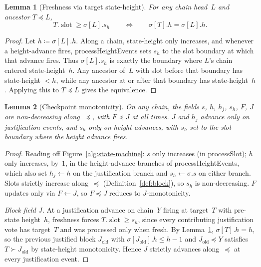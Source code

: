 \documentclass{article}
\newcommand{\slot}[0]{\ensuremath{\operatorname{\mathrm{slot}}}}
\newcommand{\processSlot}{\textsf{processSlot}\xspace}
\newcommand{\processHeightEvents}{\textsf{processHeightEvents}\xspace}
\theoremstyle{plain}
\newtheorem{lemma}{Lemma}
\theoremstyle{definition}
\theoremstyle{remark}
\begin{document}
\begin{lemma}[Freshness via target state-height]\label{lem:fresh-equiv}
For any chain head~$L$ and ancestor $T \preceq L$,
\[
  T.\slot \geq \sigma[L].s_h
  \qquad\Longleftrightarrow\qquad
  \sigma[T].h = \sigma[L].h .
\]
\end{lemma}

\begin{proof}
Let $h \coloneqq \sigma[L].h$.
Along a chain, state-height only increases, and whenever a height-advance fires, \processHeightEvents sets $s_h$ to the slot boundary at which that advance fires.
Thus $\sigma[L].s_h$ is exactly the boundary where $L$'s chain entered state-height~$h$.
Any ancestor of~$L$ with slot before that boundary has state-height $< h$, while any ancestor at or after that boundary has state-height~$h$.
Applying this to $T \preceq L$ gives the equivalence.
\end{proof}

\begin{lemma}[Checkpoint monotonicity]\label{lem:slotmono}
On any chain, the fields $s$, $h$, $h_j$, $s_h$, $F$, $J$ are non-decreasing along~$\preceq$, with $F \preceq J$ at all times.
$J$ and $h_j$ advance only on justification events, and $s_h$ only on height-advances, with $s_h$ set to the slot boundary where the height advance fires.
\end{lemma}

\begin{proof}
Reading off Figure~\ref{alg:state-machine}: $s$ only increases (in \processSlot); $h$ only increases, by~$1$, in the height-advance branches of \processHeightEvents, which also set $h_j \gets h$ on the justification branch and $s_h \gets \sigma.s$ on either branch.
Slots strictly increase along~$\preceq$ (Definition~\ref{def:block}), so $s_h$ is non-decreasing.
$F$ updates only via $F \gets J$, so $F \preceq J$ reduces to $J$-monotonicity.

\emph{Block field $J$.}
At a justification advance on chain~$Y$ firing at target~$T$ with pre-state height~$h$, freshness forces $T.\slot \geq s_h$, since every contributing justification vote has target~$T$ and was processed only when fresh.
By Lemma~\ref{lem:fresh-equiv}, $\sigma[T].h = h$, so the previous justified block $J_{\mathrm{old}}$ with $\sigma[J_{\mathrm{old}}].h \leq h-1$ and $J_{\mathrm{old}} \preceq Y$ satisfies $T \succ J_{\mathrm{old}}$ by state-height monotonicity.
Hence $J$ strictly advances along~$\preceq$ at every justification event.
\end{proof}
\end{document}
